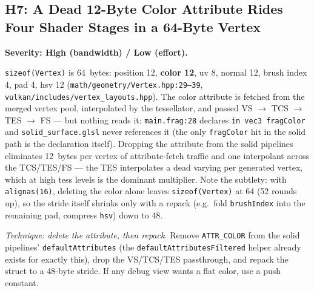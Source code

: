 \documentclass[11pt,a4paper]{article}
\begin{document}
\subsection{H7: A Dead 12-Byte Color Attribute Rides Four Shader Stages in a 64-Byte Vertex}
\label{sec:h7}

\textbf{Severity: High (bandwidth) / Low (effort).}

\texttt{sizeof(Vertex)} is 64~bytes: position 12, \textbf{color 12}, uv 8,
normal 12, brush index 4, pad 4, hsv 12 (\texttt{math/geometry/Vertex.hpp:29--39},
\texttt{vulkan/includes/vertex\_layouts.hpp}). The color attribute is fetched
from the merged vertex pool, interpolated by the tessellator, and passed
VS $\rightarrow$ TCS $\rightarrow$ TES $\rightarrow$ FS --- but nothing reads
it: \texttt{main.frag:28} declares \texttt{in vec3 fragColor} and
\texttt{solid\_surface.glsl} never references it (the only \texttt{fragColor}
hit in the solid path is the declaration itself). Dropping the attribute from
the solid pipelines eliminates 12~bytes per vertex of attribute-fetch traffic
and one interpolant across the TCS/TES/FS --- the TES interpolates a dead
varying per generated vertex, which at high tess levels is the dominant
multiplier. Note the subtlety: with \texttt{alignas(16)}, deleting the color
alone leaves \texttt{sizeof(Vertex)} at 64 (52 rounds up), so the stride
itself shrinks only with a repack (e.g.\ fold \texttt{brushIndex} into the
remaining pad, compress \texttt{hsv}) down to 48.

\textit{Technique: delete the attribute, then repack.} Remove
\texttt{ATTR\_COLOR} from the solid pipelines' \texttt{defaultAttributes} (the
\texttt{defaultAttributesFiltered} helper already exists for exactly this),
drop the VS/TCS/TES passthrough, and repack the struct to a 48-byte stride.
If any debug view wants a flat color, use a push constant.
\end{document}
